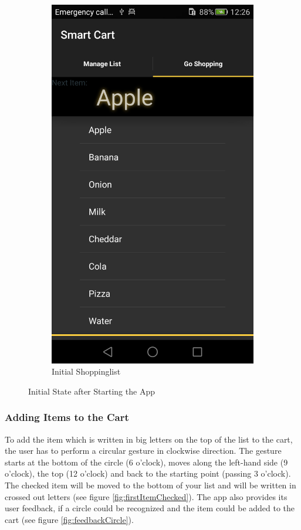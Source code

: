 \begin{figure}[h]
\begin{subfigure}{0.475\textwidth}
\includegraphics[height= 0.3\textheight]{res/usermanual/initialShoppinglist.png}
\caption{Initial Shoppinglist}
\label{fig:initial}
\end{subfigure}
\caption{Initial State after Starting the App}
\label{fig:initialState}
\end{figure}

\subsubsection{Adding Items to the Cart}
To add the item which is written in big letters on the top of the list to the
cart, the user has to perform a circular gesture in clockwise direction.
The gesture starts at the bottom of the circle (6 o'clock), moves along the
left-hand side (9 o'clock), the top (12 o'clock) and back to the starting point
(passing 3 o'clock). The checked item will be moved to the bottom of your list
and will be written in crossed out letters (see figure
\ref{fig:firstItemChecked}). The app also provides its user feedback, if a
circle could be recognized and the item could be added to the cart (see figure
\ref{fig:feedbackCircle}).

